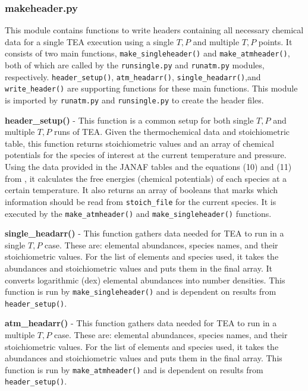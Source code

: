 \subsubsection{makeheader.py}
\label{makeheaderSec}

This module contains functions to write headers containing all
necessary chemical data for a single TEA execution using a single $T,
P$ and multiple $T, P$ points. It consists of two main
functions, \newline \texttt{make\_singleheader()}
and \texttt{make\_atmheader()}, both of which are called by the
\newline \texttt{runsingle.py} and \texttt{runatm.py} modules,
respectively. \texttt{header\_setup()}, \newline \texttt{atm\_headarr()}, \texttt{single\_headarr()},and \texttt{write\_header()}
are supporting functions for these main functions. This module is
imported by \texttt{runatm.py} and \texttt{runsingle.py} to create the
header files.

{\bf header\_setup()} - This function is a common setup for both
single $T, P$ and multiple $T, P$ runs of TEA. Given the
thermochemical data and stoichiometric table, this function returns
stoichiometric values and an array of chemical potentials for the
species of interest at the current temperature and pressure.  Using
the data provided in the JANAF tables and the equations (10) and (11)
from \citet{BlecicEtal2016-TEAtheory}, it calculates the free energies
(chemical potentials) of each species at a certain temperature. It
also returns an array of booleans that marks which information should
be read from \texttt{stoich\_file} for the current species. It is
executed by the \texttt{make\_atmheader()}
and \texttt{make\_singleheader()} functions.

{\bf single\_headarr()} - This function gathers data needed for TEA to
run in a single $T, P$ case. These are: elemental abundances, species
names, and their stoichiometric values. For the list of elements and
species used, it takes the abundances and stoichiometric values and
puts them in the final array. It converts logarithmic (dex) elemental
abundances into number densities. This function is run
by \texttt{make\_singleheader()} and is dependent on results
from \texttt{header\_setup()}.

{\bf atm\_headarr()} - This function gathers data needed for TEA to
run in a multiple $T, P$ case. These are: elemental abundances,
species names, and their stoichiometric values. For the list of
elements and species used, it takes the abundances and stoichiometric
values and puts them in the final array. This function is run
by \texttt{make\_atmheader()} and is dependent on results
from \texttt{header\_setup()}.

